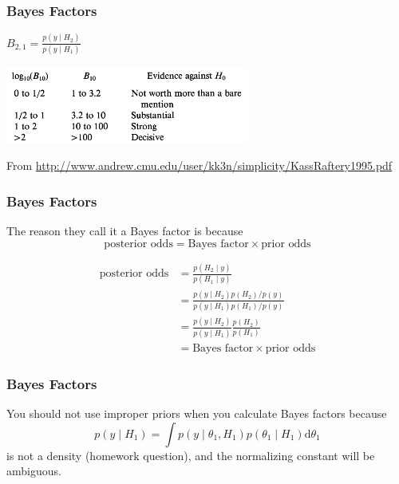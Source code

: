 \documentclass{beamer}
\begin{document}
\begin{frame}
\frametitle{Bayes Factors}

$B_{2,1} = \frac{p(y \mid H_2)}{p(y \mid H_1)}$

\begin{center}
\includegraphics[width=80mm]{bf_scale.png}
\end{center}

From \url{http://www.andrew.cmu.edu/user/kk3n/simplicity/KassRaftery1995.pdf}

\end{frame}


\begin{frame}
\frametitle{Bayes Factors}

The reason they call it a Bayes factor is because
\[
\text{posterior odds} = \text{Bayes factor} \times \text{prior odds}
\]
\pause

\begin{align*}
\text{posterior odds} &= \frac{p(H_2 \mid y)}{p(H_1 \mid y)} \\
&= \frac{p(y \mid H_2)p(H_2) / p(y)}{p(y \mid H_1)p(H_1) / p(y)} \tag{Bayes rule} \\
&= \frac{p(y \mid H_2)}{p(y \mid H_1)} \frac{p(H_2)}{p(H_1)} \\
&= \text{Bayes factor} \times \text{prior odds}
\end{align*}



\end{frame}


\begin{frame}
\frametitle{Bayes Factors}

You should not use improper priors when you calculate Bayes factors because
\[
p(y \mid H_1) = \int p(y \mid \theta_1, H_1)p(\theta_1 \mid H_1) \text{d}\theta_1
\]
is not a density (homework question), and the normalizing constant will be ambiguous.

\end{frame}
\end{document}
